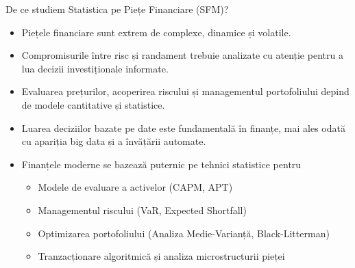 \documentclass[9pt, aspectratio=169, t]{beamer}
\theoremstyle{definition}
\begin{document}
\begin{frame}{De ce studiem Statistica pe Piețe Financiare (SFM)?}
\begin{itemize}
    \item Piețele financiare sunt extrem de complexe, dinamice și volatile.
    \item Compromisurile între risc și randament trebuie analizate cu atenție pentru a lua decizii investiționale informate.
    \item Evaluarea prețurilor, acoperirea riscului și managementul portofoliului depind de modele cantitative și statistice.
    \item Luarea deciziilor bazate pe date este fundamentală în finanțe, mai ales odată cu apariția big data și a învățării automate.
    \item Finanțele moderne se bazează puternic pe tehnici statistice pentru
    \begin{itemize}
        \item Modele de evaluare a activelor (CAPM, APT)
        \item Managementul riscului (VaR, Expected Shortfall)
        \item Optimizarea portofoliului (Analiza Medie-Varianță, Black-Litterman)
        \item Tranzacționare algoritmică și analiza microstructurii pieței
    \end{itemize}
\end{itemize}
\end{frame}
\end{document}
